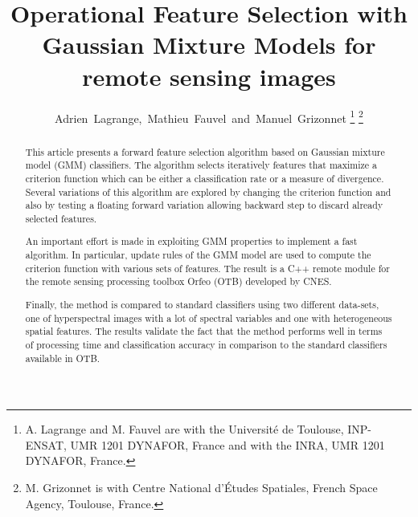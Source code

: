 \documentclass[journal]{IEEEtran}
\begin{document}
%
\title{Operational Feature Selection with Gaussian Mixture Models for remote sensing images}
%
%
%

\author{Adrien~Lagrange,~Mathieu~Fauvel~and~Manuel~Grizonnet%
\thanks{A. Lagrange and M. Fauvel are with the Universit\'{e} de Toulouse,
INP-ENSAT, UMR 1201 DYNAFOR, France and with the INRA, UMR 1201
DYNAFOR, France.}
\thanks{M. Grizonnet is with Centre National d'\'{E}tudes Spatiales, French Space Agency, Toulouse, France.}}


\maketitle

\begin{abstract}
This article presents a forward feature selection algorithm based on Gaussian mixture model (GMM) classifiers. The algorithm selects iteratively features that maximize a criterion function which can be either a classification rate or a measure of divergence. Several variations of this algorithm are explored by changing the criterion function and also by testing a floating forward variation allowing backward step to discard already selected features.

An important effort is made in exploiting GMM properties to implement a fast algorithm. In particular, update rules of the GMM model are used to compute the criterion function with various sets of features. The result is a C++ remote module for the remote sensing processing toolbox Orfeo (OTB) developed by CNES.

Finally, the method is compared to standard classifiers using two different data-sets, one of hyperspectral images with a lot of spectral variables and one with heterogeneous spatial features. The results validate the fact that the method performs well in terms of processing time and classification accuracy in comparison to the standard classifiers available in OTB.\\
\end{abstract}
\end{document}
